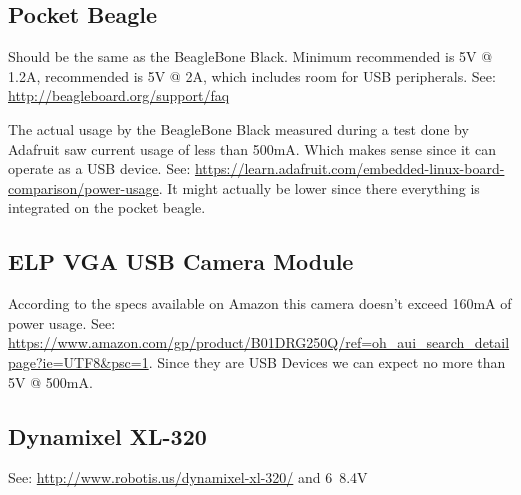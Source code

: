 \documentclass[]{book}
\begin{document}
\subsection{Pocket Beagle}
Should be the same as the BeagleBone Black. Minimum recommended is 5V @ 1.2A, recommended is 5V @ 2A, which includes room for USB peripherals. See: \url{http://beagleboard.org/support/faq}

The actual usage by the BeagleBone Black measured during a test done by Adafruit saw current usage of less than 500mA. Which makes sense since it can operate as a USB device. See: \url{https://learn.adafruit.com/embedded-linux-board-comparison/power-usage}. It might actually be lower since there everything is integrated on the pocket beagle.

\subsection{ELP VGA USB Camera Module}
According to the specs available on Amazon this camera doesn't exceed 160mA of power usage. See: \url{https://www.amazon.com/gp/product/B01DRG250Q/ref=oh_aui_search_detailpage?ie=UTF8&psc=1}. Since they are USB Devices we can expect no more than 5V @ 500mA. 

\subsection{Dynamixel XL-320}
See: \url{http://www.robotis.us/dynamixel-xl-320/} and
6~8.4V
\end{document}
